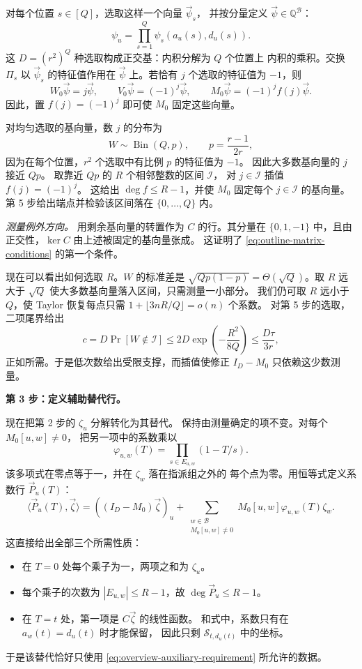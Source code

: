 对每个位置 $s\in[Q]$，选取这样一个向量 $\vec\psi_s$，
并按分量定义 $\vec\psi\in\mathbb Q^{\mathcal B}$：
\[
 \psi_u=\prod_{s=1}^Q\psi_s(a_u(s),d_u(s)).
\]
这 $D=(r^2)^Q$ 种选取构成正交基：内积分解为 $Q$ 个位置上
内积的乘积。交换 $\Pi_s$ 以 $\vec\psi_s$ 的特征值作用在
$\vec\psi$ 上。若恰有 $j$ 个选取的特征值为 $-1$，则
\[
 W_0\vec\psi=j\vec\psi,\qquad
 V_0\vec\psi=(-1)^j\vec\psi,\qquad
 M_0\vec\psi=(-1)^jf(j)\vec\psi.
\]
因此，置 $f(j)=(-1)^j$ 即可使 $M_0$ 固定这些向量。

对均匀选取的基向量，数 $j$ 的分布为
\[
 W\sim\operatorname{Bin}(Q,p),\qquad p=\frac{r-1}{2r},
\]
因为在每个位置，$r^2$ 个选取中有比例 $p$ 的特征值为 $-1$。
因此大多数基向量的 $j$ 接近 $Qp$。
取靠近 $Qp$ 的 $R$ 个相邻整数的区间 $\mathcal I$，
对 $j\in\mathcal I$ 插值 $f(j)=(-1)^j$。
这给出 $\deg f\le R-1$，并使 $M_0$ 固定每个 $j\in\mathcal I$
的基向量。第 5 步给出端点并检验该区间落在 $\{0,\ldots,Q\}$
内。

\smallskip\noindent
\emph{测量例外方向。}
用剩余基向量的转置作为 $C$ 的行。其分量在 $\{0,1,-1\}$
中，且由正交性，$\ker C$ 由上述被固定的基向量张成。
这证明了 \eqref{eq:outline-matrix-conditions} 的第一个条件。

现在可以看出如何选取 $R$。$W$ 的标准差是
$\sqrt{Qp(1-p)}=\Theta(\sqrt Q)$。取 $R$ 远大于 $\sqrt Q$
使大多数基向量落入区间，只需测量一小部分。
我们仍可取 $R$ 远小于 $Q$，使 Taylor 恢复每点只需
$1+\lfloor 3nR/Q\rfloor=o(n)$ 个系数。
对第 5 步的选取，二项尾界给出
\[
 c=D\Pr[W\notin\mathcal I]
      \le 2D\exp\!\left(-\frac{R^2}{8Q}\right)
      \le\frac{D\tau}{3r},
\]
正如所需。于是低次数给出受限支撑，而插值使修正
$I_D-M_0$ 只依赖这少数测量。

\medskip\noindent
\textbf{第 3 步：定义辅助替代行。}\par\nobreak
\smallskip\noindent
现在把第 2 步的 $\zeta_u$ 分解转化为其替代。
保持由测量确定的项不变。对每个 $M_0[u,w]\ne0$，
把另一项中的系数乘以
\[
 \varphi_{u,w}(T)=\prod_{s\in E_{u,w}}(1-T/s).
\]
该多项式在零点等于一，并在 $\zeta_w$ 落在指派组之外的
每个点为零。用恒等式定义系数行 $\vec P_u(T)$：
\begin{equation}\label{eq:outline-auxiliary-row}
 \langle\vec P_u(T),\vec\zeta\rangle
 =((I_D-M_0)\vec\zeta)_u+
   \sum_{\substack{w\in\mathcal B\\M_0[u,w]\ne0}}
                M_0[u,w]\varphi_{u,w}(T)\zeta_w.
\end{equation}
这直接给出全部三个所需性质：
\begin{itemize}
\item 在 $T=0$ 处每个乘子为一，两项之和为 $\zeta_u$。
\item 每个乘子的次数为 $|E_{u,w}|\le R-1$，故
$\deg\vec P_u\le R-1$。
\item 在 $T=t$ 处，第一项是 $C\vec\zeta$ 的线性函数。
和式中，系数只有在 $a_w(t)=d_u(t)$ 时才能保留，
因此只剩 $\mathcal S_{t,d_u(t)}$ 中的坐标。
\end{itemize}
于是该替代恰好只使用
\eqref{eq:overview-auxiliary-requirement} 所允许的数据。

